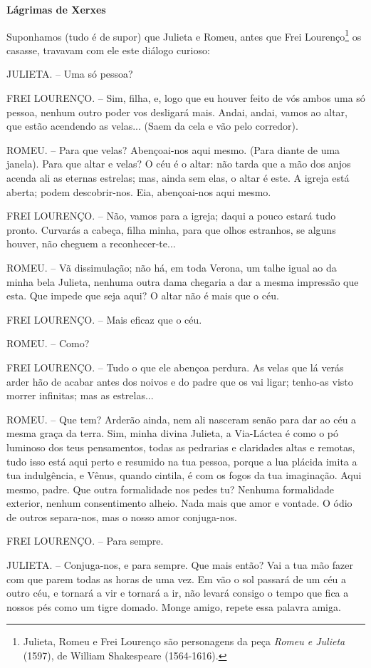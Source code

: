 \textbf{Lágrimas de Xerxes}

Suponhamos (tudo é de supor) que Julieta e Romeu, antes que Frei
Lourenço\footnote{Julieta, Romeu e Frei Lourenço são personagens da peça
  \emph{Romeu e Julieta} (1597), de William Shakespeare (1564-1616).} os
casasse, travavam com ele este diálogo curioso:

JULIETA. -- Uma só pessoa?

FREI LOURENÇO. -- Sim, filha, e, logo que eu houver feito de vós ambos
uma só pessoa, nenhum outro poder vos desligará mais. Andai, andai,
vamos ao altar, que estão acendendo as velas... (Saem da cela e vão pelo
corredor).

ROMEU. -- Para que velas? Abençoai-nos aqui mesmo. (Para diante de uma
janela). Para que altar e velas? O céu é o altar: não tarda que a mão
dos anjos acenda ali as eternas estrelas; mas, ainda sem elas, o altar é
este. A igreja está aberta; podem descobrir-nos. Eia, abençoai-nos aqui
mesmo.

FREI LOURENÇO. -- Não, vamos para a igreja; daqui a pouco estará tudo
pronto. Curvarás a cabeça, filha minha, para que olhos estranhos, se
alguns houver, não cheguem a reconhecer-te...

ROMEU. -- Vã dissimulação; não há, em toda Verona, um talhe igual ao da
minha bela Julieta, nenhuma outra dama chegaria a dar a mesma impressão
que esta. Que impede que seja aqui? O altar não é mais que o céu.

FREI LOURENÇO. -- Mais eficaz que o céu.

ROMEU. -- Como?

FREI LOURENÇO. -- Tudo o que ele abençoa perdura. As velas que lá verás
arder hão de acabar antes dos noivos e do padre que os vai ligar;
tenho-as visto morrer infinitas; mas as estrelas...

ROMEU. -- Que tem? Arderão ainda, nem ali nasceram senão para dar ao céu
a mesma graça da terra. Sim, minha divina Julieta, a Via-Láctea é como o
pó luminoso dos teus pensamentos, todas as pedrarias e claridades altas
e remotas, tudo isso está aqui perto e resumido na tua pessoa, porque a
lua plácida imita a tua indulgência, e Vênus, quando cintila, é com os
fogos da tua imaginação. Aqui mesmo, padre. Que outra formalidade nos
pedes tu? Nenhuma formalidade exterior, nenhum consentimento alheio.
Nada mais que amor e vontade. O ódio de outros separa-nos, mas o nosso
amor conjuga-nos.

FREI LOURENÇO. -- Para sempre.

JULIETA. -- Conjuga-nos, e para sempre. Que mais então? Vai a tua mão
fazer com que parem todas as horas de uma vez. Em vão o sol passará de
um céu a outro céu, e tornará a vir e tornará a ir, não levará consigo o
tempo que fica a nossos pés como um tigre domado. Monge amigo, repete
essa palavra amiga.

